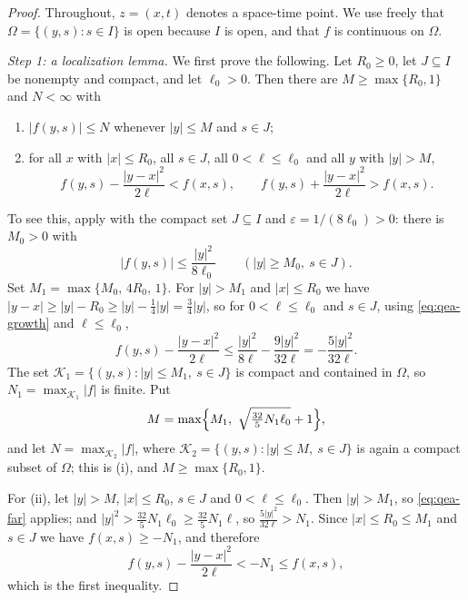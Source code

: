 \begin{proof}
Throughout, $z=(x,t)$ denotes a space-time point. We use freely that
$\Omega=\{(y,s):s\in I\}$ is open because $I$ is open, and that $f$ is
continuous on $\Omega$.

\emph{Step 1: a localization lemma.}
We first prove the following. Let $R_0\ge0$, let $J\subseteq I$ be nonempty and
compact, and let $\ell_0>0$. Then there are $M\ge\max\{R_0,1\}$ and $N<\infty$
with
\begin{enumerate}
\item[(i)] $|f(y,s)|\le N$ whenever $|y|\le M$ and $s\in J$;
\item[(ii)] for all $x$ with $|x|\le R_0$, all $s\in J$, all $0<\ell\le\ell_0$
and all $y$ with $|y|>M$,
\[
  f(y,s)-\frac{|y-x|^2}{2\ell}<f(x,s),
  \qquad
  f(y,s)+\frac{|y-x|^2}{2\ell}>f(x,s).
\]
\end{enumerate}

To see this, apply  with the compact set
$J\subseteq I$ and $\varepsilon=1/(8\ell_0)>0$: there is $M_0>0$ with
\begin{equation}\label{eq:qea-growth}
  |f(y,s)|\le\frac{|y|^2}{8\ell_0}\qquad(|y|\ge M_0,\ s\in J).
\end{equation}
Set $M_1=\max\{M_0,\,4R_0,\,1\}$. For $|y|>M_1$ and $|x|\le R_0$ we have
$|y-x|\ge|y|-R_0\ge|y|-\tfrac14|y|=\tfrac34|y|$, so for $0<\ell\le\ell_0$ and
$s\in J$, using \eqref{eq:qea-growth} and $\ell\le\ell_0$,
\begin{equation}\label{eq:qea-far}
  f(y,s)-\frac{|y-x|^2}{2\ell}
   \le\frac{|y|^2}{8\ell}-\frac{9|y|^2}{32\ell}
   =-\frac{5|y|^2}{32\ell}.
\end{equation}
The set $\mathcal K_1=\{(y,s):|y|\le M_1,\ s\in J\}$ is compact and contained in
$\Omega$, so $N_1=\max_{\mathcal K_1}|f|$ is finite. Put
\[
  M=\max\Bigl\{M_1,\ \sqrt{\tfrac{32}{5}N_1\ell_0}+1\Bigr\},
\]
and let $N=\max_{\mathcal K_2}|f|$, where
$\mathcal K_2=\{(y,s):|y|\le M,\ s\in J\}$ is again a compact subset of
$\Omega$; this is (i), and $M\ge\max\{R_0,1\}$.

For (ii), let $|y|>M$, $|x|\le R_0$, $s\in J$ and $0<\ell\le\ell_0$. Then
$|y|>M_1$, so \eqref{eq:qea-far} applies; and
$|y|^2>\tfrac{32}{5}N_1\ell_0\ge\tfrac{32}{5}N_1\ell$, so
$\tfrac{5|y|^2}{32\ell}>N_1$. Since $|x|\le R_0\le M_1$ and $s\in J$ we have
$f(x,s)\ge-N_1$, and therefore
\[
  f(y,s)-\frac{|y-x|^2}{2\ell}<-N_1\le f(x,s),
\]
which is the first inequality.


\end{proof}
